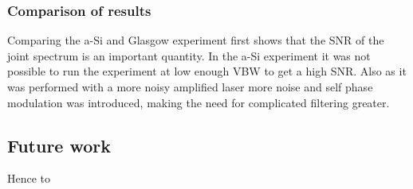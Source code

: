 \subsubsection{Comparison of results}
Comparing the a-Si and Glasgow experiment first shows that the SNR of the joint spectrum is an important quantity. In the a-Si experiment it was not possible to run the experiment at low enough VBW to get a high SNR. Also as it was performed with a more noisy amplified laser more noise and self phase modulation was introduced, making the need for complicated filtering greater. 





\subsection{Future work}

Hence to 
%